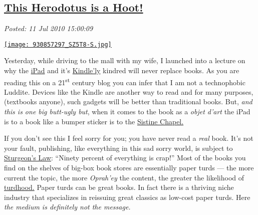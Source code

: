 %

\subsection*{\href{http://bakerjd99.wordpress.com/2010/07/11/this-herodotus-is-a-hoot/}{This Herodotus is a Hoot!}}


\noindent\emph{Posted: 11 Jul 2010 15:00:09}
\vspace{6pt}


\captionsetup[floatingfigure]{labelformat=empty}
\begin{floatingfigure}[l]{0.26\textwidth}
\centering
\href{http://www.openlettersmonthly.com/december-landfall/}{\texttt{[image: 930857297\_SZ5T8-S.jpg]}}
\label{fig:660X0}
\end{floatingfigure}Yesterday, while driving to the mall with my wife, I launched into a
lecture on why the
\href{http://news.cnet.com/8301-17852\_3-20004899-71.html}{iPad} and
it's
\href{http://www.amazon.com/Kindle-Wireless-Reading-Display-Globally/dp/B0015T963C}{Kindle'ly}
kindred will never replace books. As you are reading this on a 21\textsuperscript{st}
century blog you can infer that I am not a technophobic Luddite. Devices
like the Kindle are another way to read and for many purposes,
(textbooks anyone), such gadgets will be better than traditional books.
But, \emph{and this is one big butt-ugly but}, when it comes to the book
as a \emph{objet d'art} the iPad is to a book like a bumper sticker is
to the
\href{http://www.wga.hu/frames-e.html?/html/m/michelan/3sistina/}{Sistine
Chapel.}

If you don't see this I feel sorry for you; you have never read a
\emph{real} book. It's not your fault, publishing, like everything in
this sad sorry world, is subject to
\href{http://en.wikipedia.org/wiki/Sturgeon's\_Law}{Sturgeon's Law}:
``Ninety percent of everything is crap!'' Most of the books you find on
the shelves of big-box book stores are essentially paper turds --- the
more current the topic, the more \emph{Oprah'ey} the content, the
greater the likelihood of
\href{http://www.amazon.com/Dreams-My-Father-Story-Inheritance/dp/1400082773}{turdhood.}
Paper turds can be great books. In fact there is a thriving niche
industry that specializes in reissuing great classics as low-cost paper
turds. Here \emph{the medium is definitely not the message.}

